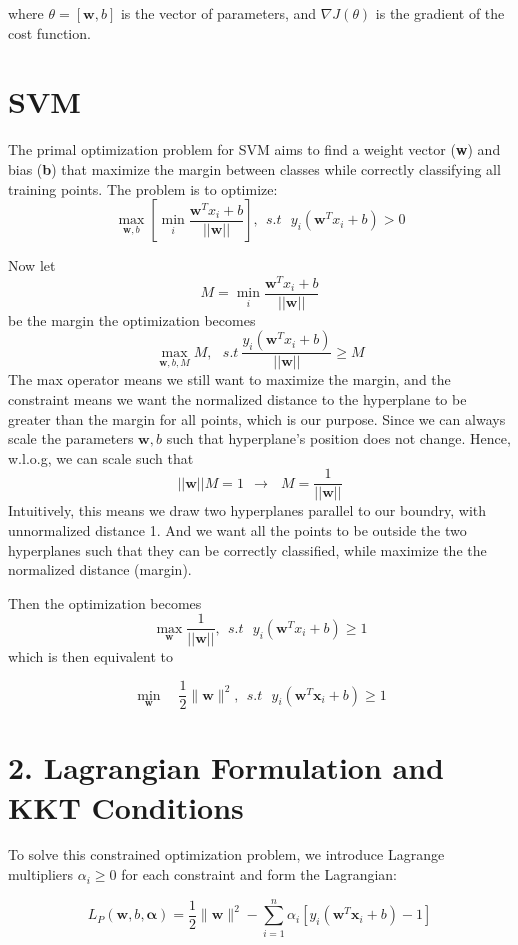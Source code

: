 \documentclass[
]{article}
\begin{document}
where \(\theta = [\mathbf{w}, b]\) is the vector of parameters, and
\(\nabla J(\theta)\) is the gradient of the cost function.

\section{SVM}\label{svm}

The primal optimization problem for SVM aims to find a weight vector
(\textbf{w}) and bias (\textbf{b}) that maximize the margin between
classes while correctly classifying all training points. The problem is
to optimize: \[
\max_{\mathbf{w}, b} [\min_{i} \frac{\mathbf{w}^Tx_i+b}{||\mathbf{w}||}],~~s.t~~~y_i(\mathbf{w}^Tx_i+b)>0
\]

Now let \[M = \min_{i} \frac{\mathbf{w}^Tx_i+b}{||\mathbf{w}||}\] be the
margin the optimization becomes \[
\max_{\mathbf{w}, b,M} M, ~~~s.t~ \frac{y_i(\mathbf{w}^Tx_i+b)}{||\mathbf{w}||}\geq M
\] The max operator means we still want to maximize the margin, and the
constraint means we want the normalized distance to the hyperplane to be
greater than the margin for all points, which is our purpose. Since we
can always scale the parameters \({\mathbf{w},b}\) such that
hyperplane's position does not change. Hence, w.l.o.g, we can scale such
that \[
||\mathbf{w}||M=1~~\rightarrow~~~M=\frac{1}{||\mathbf{w}||}
\] Intuitively, this means we draw two hyperplanes parallel to our
boundry, with unnormalized distance 1. And we want all the points to be
outside the two hyperplanes such that they can be correctly classified,
while maximize the the normalized distance (margin).

Then the optimization becomes \[
\max_{\mathbf{w}} \frac{1}{||\mathbf{w}||}, ~~s.t~~~y_i(\mathbf{w}^Tx_i+b) \geq 1
\] which is then equivalent to

\[
\min_{\mathbf{w}} \quad \frac{1}{2} \|\mathbf{w}\|^2,~~s.t~~~ y_i (\mathbf{w}^T \mathbf{x}_i + b) \geq 1
\]

\section{2. Lagrangian Formulation and KKT
Conditions}\label{lagrangian-formulation-and-kkt-conditions}

To solve this constrained optimization problem, we introduce Lagrange
multipliers \(\alpha_i \geq 0\) for each constraint and form the
Lagrangian:

\[
L_P(\mathbf{w}, b, \boldsymbol{\alpha}) = \frac{1}{2} \|\mathbf{w}\|^2 - \sum_{i=1}^n \alpha_i \left[ y_i (\mathbf{w}^T \mathbf{x}_i + b) - 1 \right]
\]
\end{document}
